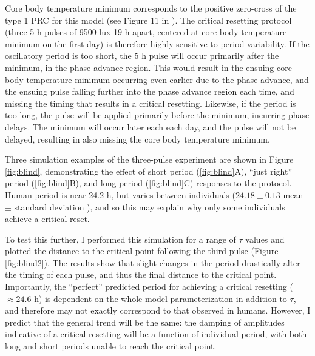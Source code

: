 Core body temperature minimum corresponds to the positive zero-cross of the type 1 PRC for this model (see Figure 11 in \cite{Kronauer1999}).
The critical resetting protocol (three 5-h pulses of 9500 lux 19 h apart, centered at core body temperature minimum on the first day) is therefore highly sensitive to period variability.
If the oscillatory period is too short, the 5 h pulse will occur primarily after the minimum, in the phase advance region.
This would result in the ensuing core body temperature minimum occurring even earlier due to the phase advance, and the ensuing pulse falling further into the phase advance region each time, and missing the timing that results in a critical resetting.
Likewise, if the period is too long, the pulse will be applied primarily before the minimum, incurring phase delays.
The minimum will occur later each each day, and the pulse will not be delayed, resulting in also missing the core body temperature minimum.

Three simulation examples of the three-pulse experiment are shown in Figure \ref{fig:blind}, demonstrating the effect of short period (\ref{fig:blind}A), ``just right'' period (\ref{fig:blind}B), and long period (\ref{fig:blind}C) responses to the protocol.
Human period is near 24.2 h, but varies between individuals ($24.18 \pm 0.13$ mean $\pm$ standard deviation \cite{Czeisler1999}), and so this may explain why only some individuals achieve a critical reset.

To test this further, I performed this simulation for a range of $\tau$ values and plotted the distance to the critical point following the third pulse (Figure \ref{fig:blind2}).
The results show that slight changes in the period drastically alter the timing of each pulse, and thus the final distance to the critical point.
Importantly, the ``perfect'' predicted period for achieving a critical resetting ($\approx 24.6$ h) is dependent on the whole model parameterization in addition to $\tau$, and therefore may not exactly correspond to that observed in humans.
However, I predict that the general trend will be the same: the damping of amplitudes indicative of a critical resetting will be a function of individual period, with both long and short periods unable to reach the critical point.


